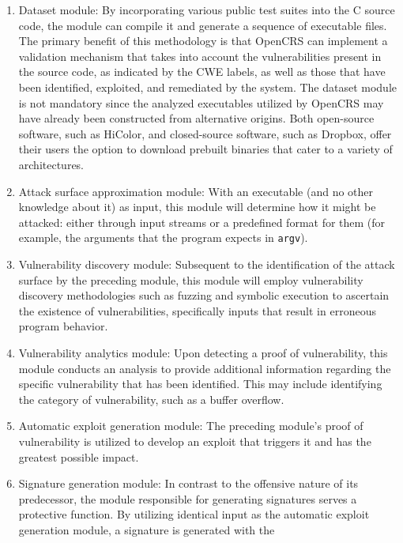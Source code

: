 \documentclass[../main.tex]{subfiles}
\begin{document}
\begin{enumerate}
\def\labelenumi{\arabic{enumi}.}
\tightlist
\item
  Dataset module: By incorporating various public test suites into the C
  source code, the module can compile it and generate a sequence of
  executable files. The primary benefit of this methodology is that
  OpenCRS can implement a validation mechanism that takes into account
  the vulnerabilities present in the source code, as indicated by the
  CWE labels, as well as those that have been identified, exploited, and
  remediated by the system. The dataset module is not mandatory since
  the analyzed executables utilized by OpenCRS may have already been
  constructed from alternative origins. Both open-source software, such
  as HiColor, and closed-source software, such as Dropbox, offer their
  users the option to download prebuilt binaries that cater to a variety
  of architectures.
\item
  Attack surface approximation module: With an executable (and no other
  knowledge about it) as input, this module will determine how it might
  be attacked: either through input streams or a predefined format for
  them (for example, the arguments that the program expects in
  \texttt{argv}).
\item
  Vulnerability discovery module: Subsequent to the identification of
  the attack surface by the preceding module, this module will employ
  vulnerability discovery methodologies such as fuzzing and symbolic
  execution to ascertain the existence of vulnerabilities, specifically
  inputs that result in erroneous program behavior.
\item
  Vulnerability analytics module: Upon detecting a proof of
  vulnerability, this module conducts an analysis to provide additional
  information regarding the specific vulnerability that has been
  identified. This may include identifying the category of
  vulnerability, such as a buffer overflow.
\item
  Automatic exploit generation module: The preceding module's proof of
  vulnerability is utilized to develop an exploit that triggers it and
  has the greatest possible impact.
\item
  Signature generation module: In contrast to the offensive nature
  of its predecessor, the module responsible for generating signatures
  serves a protective function. By utilizing identical input as the
  automatic exploit generation module, a signature is generated with the

\end{enumerate}
\end{document}
